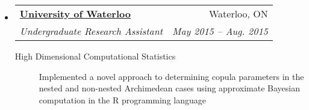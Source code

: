 \documentclass[letterpaper,10pt]{article}
\makeatletter
\newcommand{\resitem}[4]{\begin{tabular*}{17.5cm}{l@{\extracolsep{\fill}}r} \textbf{#1} & #2 \\ \textit{#3} & \textit{#4} \\ \end{tabular*} \vspace{-6pt}}
\newcommand{\ressubitem}[2]{\begin{tabular*}{17.5cm}{l@{\extracolsep{\fill}}r} \textit{#1} & \textit{#2} \\ \end{tabular*} \vspace{-6pt}}
\makeatother
\begin{document}
\begin{itemize}
{\begin{description}
			\end{description}}
\item
	\resitem{\href{https://uwaterloo.ca/}{University of Waterloo}}{Waterloo, ON}{Undergraduate Research Assistant}{May 2015 -- Aug. 2015}
		{\footnotesize \begin{description}
				\item[High Dimensional Computational Statistics] Implemented a novel approach to determining copula parameters in the nested and non-nested Archimedean cases using approximate Bayesian computation in the R programming language
			\end{description}\vspace{-4pt}}
\begin{comment}
\item
	\resitem{\href{https://www.bloomberg.com/research/stocks/private/snapshot.asp?privcapId=71456863}{Lightstream Resources Ltd.}}{Calgary, AB}{Exploitation Engineering Summer Student}{May 2014 -- Aug. 2014}
		{\footnotesize \begin{description}
				\item[Upstream Oil and Gas] Collected, organized, and analyzed, data in support of the analysis of drilling completions, fracturing, and production in the Saskatchewan Bakken operating area
				\item[Communication] {Identified data patterns that proved valuable in the future play development of Mississippian wells, presented and discussed findings with department technical and leadership staff}
			\end{description}}
\item
	\resitem{\href{http://trailswesthockey.com/}{Trails West Hockey Association}}{Calgary, AB}{On-Ice Official}{Sept. 2011 -- Mar. 2013}
		{\footnotesize \begin{description}
				\item[Teamwork and Leadership] Acted as both a linesman and a head referee for minor hockey games at the atom and peewee level, utilizing situational awareness, confidence in calls, memory of regulations, and initiative

\end{comment}
\end{itemize}
\end{document}
